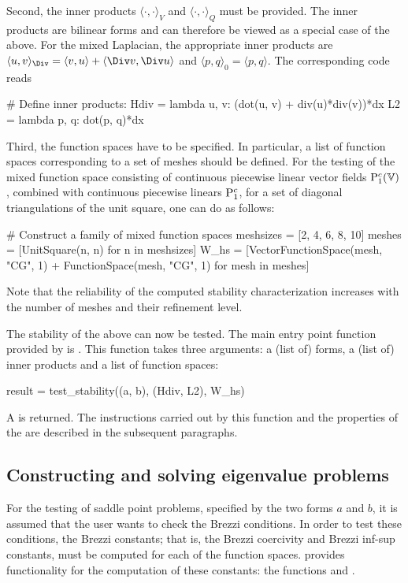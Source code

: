 Second, the inner products $\langle \cdot, \cdot \rangle_V$ and
$\langle \cdot, \cdot \rangle_Q$ must be provided. The inner products
are bilinear forms and can therefore be viewed as a special case of
the above. For the mixed Laplacian, the appropriate inner products are
$\langle u, v \rangle_{\Div} = \langle v, u \rangle + \langle \Div v,
\Div u \rangle$ and $\langle p, q \rangle_0 = \langle p, q \rangle$. The
corresponding code reads
\begin{python}
  # Define inner products:
  Hdiv = lambda u, v: (dot(u, v) + div(u)*div(v))*dx
  L2 = lambda p, q: dot(p, q)*dx
\end{python}

Third, the function spaces have to be specified. In particular, a list
of function spaces corresponding to a set of meshes should be defined.
For the testing of the mixed function space consisting of continuous
piecewise linear vector fields $\mathrm{P}^c_1(\mathbb{V})$, combined with
continuous piecewise linears $\mathrm{P}^c_1$, for a set of diagonal
triangulations of the unit square, one can do as follows:
\begin{python}
  # Construct a family of mixed function spaces
  meshsizes = [2, 4, 6, 8, 10]
  meshes = [UnitSquare(n, n) for n in meshsizes]
  W_hs = [VectorFunctionSpace(mesh, "CG", 1) + FunctionSpace(mesh, "CG", 1)
          for mesh in meshes]
\end{python}
Note that the reliability of the computed stability characterization
increases with the number of meshes and their refinement level.

The stability of the above can now be tested. The main entry point
function provided by \rognesascot{} is . This
function takes three arguments: a (list of) forms, a (list of) inner
products and a list of function spaces:
\begin{python}
  result = test_stability((a, b), (Hdiv, L2), W_hs)
\end{python}
A  is returned.  The instructions carried out
by this function and the properties of the 
are described in the subsequent paragraphs.

\subsection{Constructing and solving eigenvalue problems}

For the testing of saddle point problems, specified by the two forms
$a$ and $b$, it is assumed that the user wants to check the Brezzi
conditions. In order to test these conditions, the Brezzi constants;
that is, the Brezzi coercivity and Brezzi inf-sup constants, must be
computed for each of the function spaces. \rognesascot{} provides
functionality for the computation of these constants: the functions
 and
.

